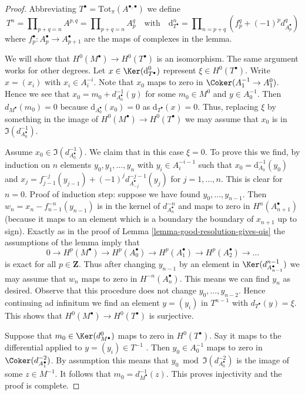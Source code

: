 \begin{proof}
Abbreviating $T^\bullet = \text{Tot}_\pi(A^{\bullet, \bullet})$
we define
$$
T^n = \prod\nolimits_{p + q = n} A^{p, q} =
\prod\nolimits_{p + q = n} A_p^q
\quad\text{with}\quad
\text{d}_{T^\bullet}^n =
\prod\nolimits_{n = p + q} (f_p^q + (-1)^pd_{A_p^\bullet}^q)
$$
where $f_p^\bullet : A_p^\bullet \to A_{p + 1}^\bullet$
are the maps of complexes in the lemma.

\medskip\noindent
We will show that $H^0(M^\bullet) \to H^0(T^\bullet)$ is an isomorphism.
The same argument works for other degrees.
Let $x \in \Ker(\text{d}_{T^\bullet}^0)$ represent $\xi \in H^0(T^\bullet)$.
Write $x = (x_i)$ with $x_i \in A_i^{-i}$.
Note that $x_0$ maps to zero in $\Coker(A_1^{-1} \to A_1^0)$.
Hence we see that $x_0 = m_0 + d_{A_0^\bullet}^{-1}(y)$ for some
$m_0 \in M^0$ and $y \in A_0^{-1}$.
Then $d_{M^\bullet}(m_0) = 0$ because $\text{d}_{A_0^\bullet}(x_0) = 0$
as $\text{d}_{T^\bullet}(x) = 0$.
Thus, replacing $\xi$ by something in the image of
$H^0(M^\bullet) \to H^0(T^\bullet)$ we may assume that $x_0$
is in $\Im(d^{-1}_{A_0^\bullet})$.

\medskip\noindent
Assume $x_0 \in \Im(d^{-1}_{A_0^\bullet})$. We claim that in this
case $\xi = 0$. To prove this we find, by induction on $n$ elements
$y_0, y_1, \ldots, y_n$ with $y_i \in A_i^{-i - 1}$ such that
$x_0 = \text{d}_{A_0}^{-1}(y_0)$ and
$x_j = f_{j - 1}^{-j}(y_{j - 1}) + (-1)^j d^{-j - 1}_{A_{-j}^\bullet}(y_j)$
for $j = 1, \ldots, n$. This is clear for $n = 0$. Proof of induction step:
suppose we have found $y_0, \ldots, y_{n - 1}$. Then
$w_n = x_n - f_{n - 1}^{-n}(y_{n - 1})$ is in the kernel of
$d^{-n}_{A_n^\bullet}$ and maps to zero in $H^n(A_{n + 1}^\bullet)$
(because it maps to an element which is a boundary the boundary
of $x_{n + 1}$ up to sign). Exactly as in the proof of
Lemma \ref{lemma-good-resolution-gives-qis}
the assumptions of the lemma imply that
$$
0 \to
H^p(M^\bullet) \to
H^p(A_0^\bullet) \to
H^p(A_1^\bullet) \to
H^p(A_2^\bullet) \to \ldots
$$
is exact for all $p \in \mathbf{Z}$. Thus after changing $y_{n - 1}$
by an element in $\Ker(d^{n - 1}_{A_{n - 1}^\bullet})$ we may assume
that $w_n$ maps to zero in $H^{-n}(A_n^\bullet)$. This means we
can find $y_n$ as desired. Observe that this procedure does not
change $y_0, \ldots, y_{n - 2}$. Hence continuing ad infinitum
we find an element $y = (y_i)$ in $T^{n - 1}$ with $d_{T^\bullet}(y) = \xi$.
This shows that $H^0(M^\bullet) \to H^0(T^\bullet)$ is surjective.

\medskip\noindent
Suppose that $m_0 \in \Ker(d^0_{M^\bullet})$ maps to zero in $H^0(T^\bullet)$.
Say it maps to the differential applied to $y = (y_i) \in T^{-1}$ .
Then $y_0 \in A_0^{-1}$ maps to zero in $\Coker(d^{-2}_{A_1^\bullet})$.
By assumption this means that $y_0 \bmod \Im(d^{-2}_{A_0^\bullet})$
is the image of some $z \in M^{-1}$. It follows that
$m_0 = d^{-1}_{M^\bullet}(z)$. This proves injectivity and the proof is
complete.
\end{proof}

